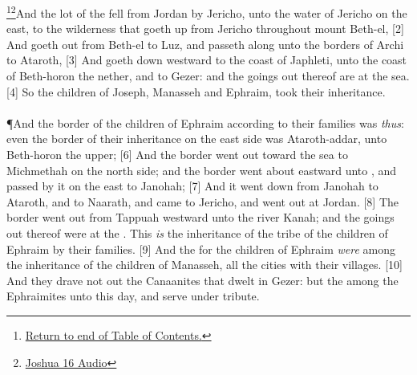 \footnote{\textcolor[cmyk]{0.99998,1,0,0}{\hyperlink{TOC}{Return to end of Table of Contents.}}}\footnote{\href{https://audiobible.com/bible/joshua_16.html}{\textcolor[cmyk]{0.99998,1,0,0}{Joshua 16 Audio}}}\textcolor[cmyk]{0.99998,1,0,0}{And the lot of the  fell from Jordan by Jericho, unto the water of Jericho on the east, to the wilderness that goeth up from Jericho throughout mount Beth-el,} 
[2] \textcolor[cmyk]{0.99998,1,0,0}{And goeth out from Beth-el to Luz, and passeth along unto the borders of Archi to Ataroth,} 
[3] \textcolor[cmyk]{0.99998,1,0,0}{And goeth down westward to the coast of Japhleti, unto the coast of Beth-horon the nether, and to Gezer: and the goings out thereof are at the sea.}
[4] \textcolor[cmyk]{0.99998,1,0,0}{So the children of Joseph, Manasseh and Ephraim, took their inheritance.}\\
\\
\P \textcolor[cmyk]{0.99998,1,0,0}{And the border of the children of Ephraim according to their families was \emph{thus}: even the border of their inheritance on the east side was Ataroth-addar, unto Beth-horon the upper;}
[6] \textcolor[cmyk]{0.99998,1,0,0}{And the border went out toward the sea to Michmethah on the north side; and the border went about eastward unto , and passed by it on the east to Janohah;} 
[7] \textcolor[cmyk]{0.99998,1,0,0}{And it went down from Janohah to Ataroth, and to Naarath, and came to Jericho, and went out at Jordan.}
[8] \textcolor[cmyk]{0.99998,1,0,0}{The border went out from Tappuah westward unto the river Kanah; and the goings out thereof were at the . This \emph{is} the inheritance of the tribe of the children of Ephraim by their families.}
[9] \textcolor[cmyk]{0.99998,1,0,0}{And the  for the children of Ephraim \emph{were} among the inheritance of the children of Manasseh, all the cities with their villages.} 
[10] \textcolor[cmyk]{0.99998,1,0,0}{And they drave not out the Canaanites that dwelt in Gezer: but the  among the Ephraimites unto this day, and serve under tribute.} 
